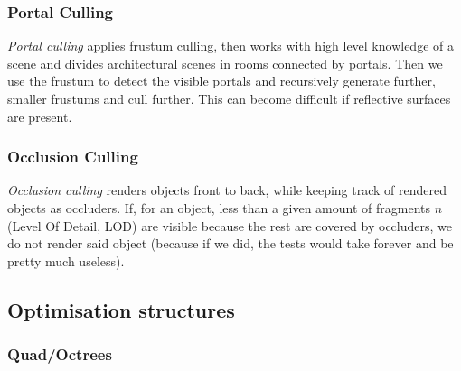 \documentclass[english]{panikzettel}
\begin{document}
\subsubsection*{Portal Culling}

\emph{Portal culling} applies frustum culling, then works with high level knowledge of a scene and divides architectural scenes in rooms connected by portals. Then we use the frustum to detect the visible portals and recursively generate further, smaller frustums and cull further. This can become difficult if reflective surfaces are present.

\subsubsection*{Occlusion Culling}

\emph{Occlusion culling} renders objects front to back, while keeping track of rendered objects as occluders. If, for an object, less than a given amount of fragments $n$ (Level Of Detail, LOD) are visible because the rest are covered by occluders, we do not render said object (because if we did, the tests would take forever and be pretty much useless).

\subsection{Optimisation structures}

\subsubsection*{Quad/Octrees}
\end{document}
